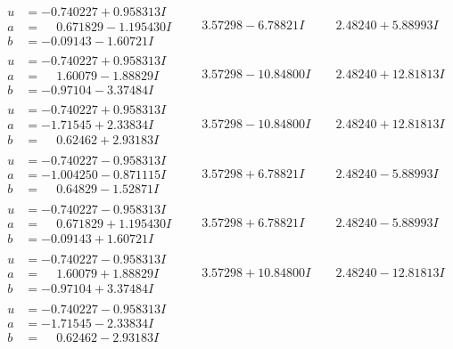 \documentclass[1p]{elsarticle_modified}
\theoremstyle{definition}
\begin{document}
$$\begin{array}{c|c|c}
\begin{aligned}
u &= -0.740227 + 0.958313 I \\
a &= \phantom{-}0.671829 - 1.195430 I \\
b &= -0.09143 - 1.60721 I\end{aligned}
 & \phantom{-}3.57298 - 6.78821 I & \phantom{-}2.48240 + 5.88993 I \\ \hline\begin{aligned}
u &= -0.740227 + 0.958313 I \\
a &= \phantom{-}1.60079 - 1.88829 I \\
b &= -0.97104 - 3.37484 I\end{aligned}
 & \phantom{-}3.57298 - 10.84800 I & \phantom{-}2.48240 + 12.81813 I \\ \hline\begin{aligned}
u &= -0.740227 + 0.958313 I \\
a &= -1.71545 + 2.33834 I \\
b &= \phantom{-}0.62462 + 2.93183 I\end{aligned}
 & \phantom{-}3.57298 - 10.84800 I & \phantom{-}2.48240 + 12.81813 I \\ \hline\begin{aligned}
u &= -0.740227 - 0.958313 I \\
a &= -1.004250 - 0.871115 I \\
b &= \phantom{-}0.64829 - 1.52871 I\end{aligned}
 & \phantom{-}3.57298 + 6.78821 I & \phantom{-}2.48240 - 5.88993 I \\ \hline\begin{aligned}
u &= -0.740227 - 0.958313 I \\
a &= \phantom{-}0.671829 + 1.195430 I \\
b &= -0.09143 + 1.60721 I\end{aligned}
 & \phantom{-}3.57298 + 6.78821 I & \phantom{-}2.48240 - 5.88993 I \\ \hline\begin{aligned}
u &= -0.740227 - 0.958313 I \\
a &= \phantom{-}1.60079 + 1.88829 I \\
b &= -0.97104 + 3.37484 I\end{aligned}
 & \phantom{-}3.57298 + 10.84800 I & \phantom{-}2.48240 - 12.81813 I \\ \hline\begin{aligned}
u &= -0.740227 - 0.958313 I \\
a &= -1.71545 - 2.33834 I \\
b &= \phantom{-}0.62462 - 2.93183 I\end{aligned}

\end{array}$$
\end{document}
